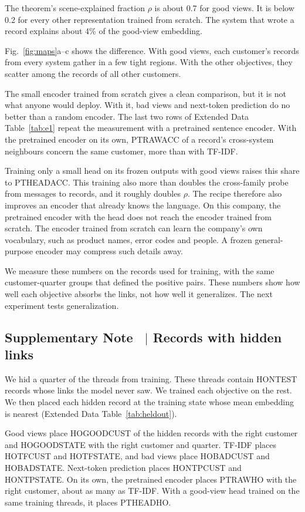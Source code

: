 \documentclass[11pt]{article}
\newcounter{suppnote}
\newcommand{\suppnote}[2]{\refstepcounter{suppnote}\label{#2}\subsection{Supplementary Note \thesuppnote\ $|$ #1}}
\begin{document}
The theorem's scene-explained fraction $\rho$ is about 0.7 for good views. It is below 0.2 for every other representation trained from scratch. The system that wrote a record explains about 4\% of the good-view embedding.

Fig.~\ref{fig:maps}a--c shows the difference. With good views, each customer's records from every system gather in a few tight regions. With the other objectives, they scatter among the records of all other customers.

The small encoder trained from scratch gives a clean comparison, but it is not what anyone would deploy. With it, bad views and next-token prediction do no better than a random encoder. The last two rows of Extended Data Table~\ref{tab:e1} repeat the measurement with a pretrained sentence encoder. With the pretrained encoder on its own, PTRAWACC of a record's cross-system neighbours concern the same customer, more than with TF-IDF.

Training only a small head on its frozen outputs with good views raises this share to PTHEADACC. This training also more than doubles the cross-family probe from messages to records, and it roughly doubles $\rho$. The recipe therefore also improves an encoder that already knows the language. On this company, the pretrained encoder with the head does not reach the encoder trained from scratch. The encoder trained from scratch can learn the company's own vocabulary, such as product names, error codes and people. A frozen general-purpose encoder may compress such details away.

We measure these numbers on the records used for training, with the same customer-quarter groups that defined the positive pairs. These numbers show how well each objective absorbs the links, not how well it generalizes. The next experiment tests generalization.

\suppnote{Records with hidden links}{sec:heldout}
We hid a quarter of the threads from training. These threads contain HONTEST records whose links the model never saw. We trained each objective on the rest. We then placed each hidden record at the training state whose mean embedding is nearest (Extended Data Table~\ref{tab:heldout}).

Good views place HOGOODCUST of the hidden records with the right customer and HOGOODSTATE with the right customer and quarter. TF-IDF places HOTFCUST and HOTFSTATE, and bad views place HOBADCUST and HOBADSTATE. Next-token prediction places HONTPCUST and HONTPSTATE. On its own, the pretrained encoder places PTRAWHO with the right customer, about as many as TF-IDF. With a good-view head trained on the same training threads, it places PTHEADHO.
\end{document}
